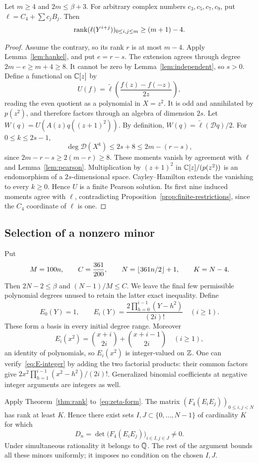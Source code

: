 \begin{theorem}\label{thm:rank}
Let $m\ge4$ and $2m\le\beta+3$.  For arbitrary complex numbers
$c_3,c_5,c_7,c_9$, put $\ell=C_4+\sum c_jB_j$.  Then
\[
 \operatorname{rank}(\ell(Y^{i+j}))_{0\le i,j\le m}\ge(m+1)-4.
\]
\end{theorem}
\begin{proof}
Assume the contrary, so its rank $r$ is at most $m-4$.
Apply Lemma~\ref{lem:hankel}, and put $e=r-s$.  The extension agrees
through degree $2m-e\ge m+4\ge8$.  It cannot be zero by
Lemma~\ref{lem:independent}, so $s>0$.
Define a functional on $\mathbb C[z]$ by
\[
 U(f)=\widetilde\ell\left(\frac{f(z)-f(-z)}{2z}\right),
\]
reading the even quotient as a polynomial in $X=z^2$.  It is odd and
annihilated by $p(z^2)$, and therefore factors through an algebra of
dimension $2s$.  Let $W(q)=U(A(z)q((z+1)^2))$.
By definition, $W(q)=\widetilde\ell(\mathcal Dq)/2$.
For $0\le k\le2s-1$,
\[
 \deg\mathcal D(X^k)\le2s+8\le2m-(r-s),
\]
since $2m-r-s\ge2(m-r)\ge8$.  These moments vanish by agreement
with $\ell$ and Lemma~\ref{lem:pearson}.  Multiplication by
$(z+1)^2$ in $\mathbb C[z]/(p(z^2))$ is an endomorphism of a
$2s$-dimensional space.  Cayley--Hamilton extends the vanishing to
every $k\ge0$.  Hence $U$ is a finite Pearson solution.  Its first
nine induced moments agree with $\ell$, contradicting
Proposition~\ref{prop:finite-restrictions}, since the $C_4$ coordinate
of $\ell$ is one.
\end{proof}

\subsection{Selection of a nonzero minor}
Put
\begin{equation}\label{eq:N-K}
 M=100n,\qquad C=\frac{361}{200},\qquad
 N=\left\lfloor361n/2\right\rfloor+1,\qquad K=N-4.
\end{equation}
Then $2N-2\le\beta$ and $(N-1)/M\le C$.  We leave the final
few permissible polynomial degrees unused to retain the latter exact
inequality.  Define
\begin{equation}\label{eq:E}
 E_0(Y)=1,\qquad
 E_i(Y)=\frac{2\prod_{h=0}^{i-1}(Y-h^2)}{(2i)!}\quad(i\ge1).
\end{equation}
These form a basis in every initial degree range.  Moreover
\begin{equation}\label{eq:E-integer}
 E_i(x^2)=\binom{x+i}{2i}+\binom{x+i-1}{2i}\quad(i\ge1),
\end{equation}
an identity of polynomials, so $E_i(x^2)$ is integer-valued on $\mathbb Z$.
One can verify~\eqref{eq:E-integer} by adding the two factorial products:
their common factors give $2x^2\prod_{h=1}^{i-1}(x^2-h^2)/(2i)!$.
Generalized binomial coefficients at negative integer arguments are
integers as well.

Apply Theorem~\ref{thm:rank} to~\eqref{eq:zeta-form}.  The matrix
$(F_4(E_iE_j))_{0\le i,j<N}$ has rank at least $K$.  Hence there
exist sets $I,J\subset\{0,\ldots,N-1\}$ of cardinality $K$ for which
\begin{equation}\label{eq:minor}
 D_n=\det\bigl(F_4(E_iE_j)\bigr)_{i\in I,j\in J}\ne0.
\end{equation}
Under simultaneous rationality it belongs to $\mathbb Q$.  The rest of the
argument bounds all these minors uniformly; it imposes no condition
on the chosen $I,J$.
